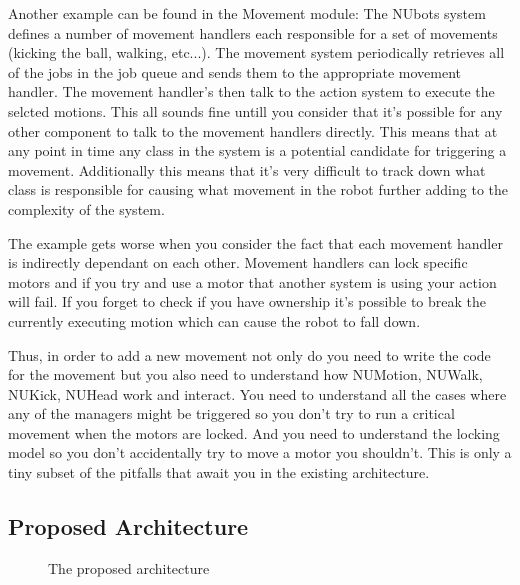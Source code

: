 \documentclass[english,12pt]{scrartcl}
\begin{document}
			Another example can be found in the Movement module:
			The NUbots system defines a number of movement handlers each responsible for a set
			of movements (kicking the ball, walking, etc...). 
			The movement system periodically retrieves all of the jobs in the job queue and sends them to the appropriate 
			movement handler. 
			The movement handler's then talk to the action system to execute the selcted motions. 
			This all sounds fine untill you consider that it's possible for any other component to talk
			to the movement handlers directly.
			This means that at any point in time any class in the system is a potential candidate
			for triggering a movement.
			Additionally this means that it's very difficult to track down what class is responsible for causing what 
			movement in the robot further adding to the complexity of the system.

			The example gets worse when you consider the fact that each movement handler is
			indirectly dependant on each other. Movement handlers can lock specific motors and if
			you try and use a motor that another system is using your action will fail. If you
			forget to check if you have ownership it's possible to break the currently executing
			motion which can cause the robot to fall down.

			Thus, in order to add a new movement not only do you need to write the code for the movement
			but you also need to understand how NUMotion, NUWalk, NUKick, NUHead work and interact.
			You need to understand all the cases where any of the managers might be triggered so you
			don't try to run a critical movement when the motors are locked. And you need to
			understand the locking model so you don't accidentally try to move a motor you
			shouldn't. This is only a tiny subset of the pitfalls that await you in the existing
			architecture.

			
		\subsection{Proposed Architecture}
			\begin{figure}[h]
				\centering
				\caption {The proposed architecture}
				\label{fig:HighLevelProposedArchitecture}
			\end{figure}
\end{document}
